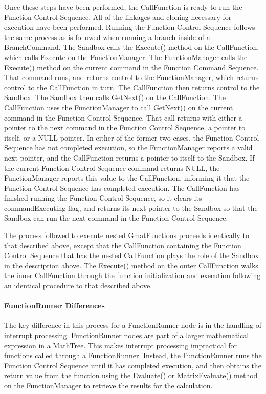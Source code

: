 Once these steps have been performed, the CallFunction is ready to run the Function Control
Sequence.  All of the linkages and cloning necessary for execution have been performed.  Running
the Function Control Sequence follows the same process as is followed when running a branch inside
of a BranchCommand.  The Sandbox calls the Execute() method on the CallFunction, which calls
Execute on the FunctionManager.  The FunctionManager calls the Execute() method on the current
command in the Function Command Sequence.  That command runs, and returns control to the
FunctionManager, which returns control to the CallFunction in turn.  The CallFunction then returns
control to the Sandbox. The Sandbox then calls GetNext() on the CallFunction.  The CallFunction
uses the FunctionManager to call GetNext() on the current command in the Function Control
Sequence. That call returns with either a pointer to the next command in the Function Control
Sequence, a pointer to itself, or a NULL pointer.  In either of the former two cases, the Function
Control Sequence has not completed execution, so the FunctionManager reports a valid next pointer,
and the CallFunction returns a pointer to itself to the Sandbox.  If the current Function Control
Sequence command returns NULL, the FunctionManager reports this value to the CallFunction,
informing it that the Function Control Sequence has completed execution.  The CallFunction has
finished running the Function Control Sequence, so it clears its commandExecuting flag, and returns
its next pointer to the Sandbox so that the Sandbox can run the next command in the Function Control
Sequence.

The process followed to execute nested GmatFunctions proceeds identically to that described above,
except that the CallFunction containing the Function Control Sequence that has the nested
CallFunction plays the role of the Sandbox in the description above.  The Execute() method on the
outer CallFunction walks the inner CallFunction through the function initialization and execution
following an identical procedure to that described above.

\paragraph{FunctionRunner Differences}  The key difference in this process for a FunctionRunner
node is in the handling of interrupt processing.  FunctionRunner nodes are part of a larger
mathematical expression in a MathTree.  This makes interrupt processing impractical for functions
called through a FunctionRunner.  Instead, the FunctionRunner runs the Function Control Sequence
until it has completed execution, and then obtains the return value from the function using the
Evaluate() or MatrixEvaluate() method on the FunctionManager to retrieve the results for the
calculation.

